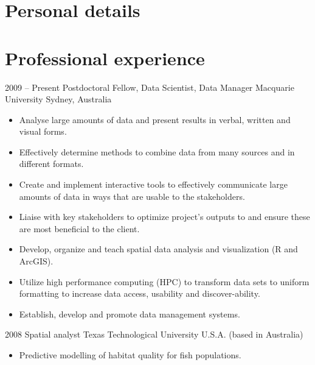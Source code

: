 \documentclass[11pt,a4paper,sans]{moderncv}        %
\begin{document}
\makecvtitle

\section{Personal details}

\section{Professional experience}

\cventry
  {2009 -- Present}
  {Postdoctoral Fellow, Data Scientist, Data Manager}
  {Macquarie University}  
  {Sydney, Australia}
  {}
  {\begin{itemize}
  \item Analyse large amounts of data and present results in verbal, written and visual forms.
  \item Effectively determine methods to combine data from many sources and in different formats.
  \item Create and implement interactive tools to effectively communicate large amounts of data in ways that are usable to the stakeholders.
  \item Liaise with key stakeholders to optimize project’s outputs to and ensure these are most beneficial to the client.
  \item Develop, organize and teach spatial data analysis and visualization (R and ArcGIS).
  \item Utilize high performance computing (HPC) to transform data sets to uniform formatting to increase data access, usability and discover-ability.
  \item Establish, develop and promote data management systems.
  \end{itemize}
  }

\cventry
  {2008}
  {Spatial analyst}
  {Texas Technological University}
  {U.S.A. (based in Australia)}
  {}
  {\begin{itemize}
  \item Predictive modelling of habitat quality for fish populations.
  \end{itemize}
  }
  
\end{document}
